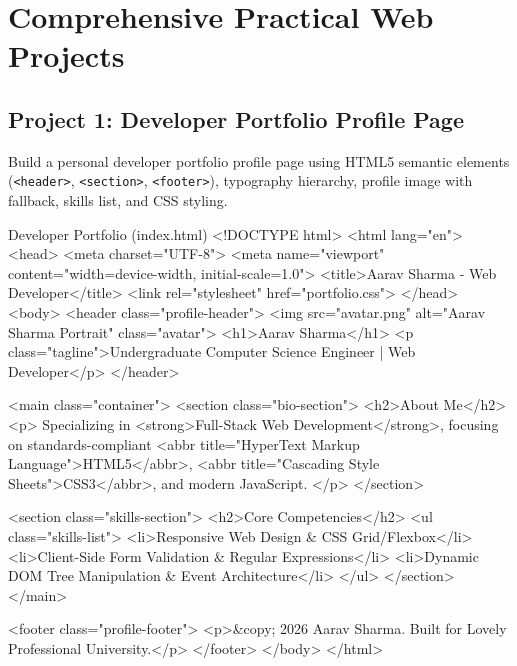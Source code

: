 \chapter{Comprehensive Practical Web Projects}
\label{chap:practical-web-projects}

\section{Project 1: Developer Portfolio Profile Page}

\begin{practiceset}
Build a personal developer portfolio profile page using HTML5 semantic elements (\texttt{<header>}, \texttt{<section>}, \texttt{<footer>}), typography hierarchy, profile image with fallback, skills list, and CSS styling.
\end{practiceset}

\begin{htmlcode}{Developer Portfolio (index.html)}
<!DOCTYPE html>
<html lang="en">
<head>
    <meta charset="UTF-8">
    <meta name="viewport" content="width=device-width, initial-scale=1.0">
    <title>Aarav Sharma - Web Developer</title>
    <link rel="stylesheet" href="portfolio.css">
</head>
<body>
    <header class="profile-header">
        <img src="avatar.png" alt="Aarav Sharma Portrait" class="avatar">
        <h1>Aarav Sharma</h1>
        <p class="tagline">Undergraduate Computer Science Engineer | Web Developer</p>
    </header>

    <main class="container">
        <section class="bio-section">
            <h2>About Me</h2>
            <p>
                Specializing in <strong>Full-Stack Web Development</strong>, focusing on 
                standards-compliant <abbr title="HyperText Markup Language">HTML5</abbr>, 
                <abbr title="Cascading Style Sheets">CSS3</abbr>, and modern JavaScript.
            </p>
        </section>

        <section class="skills-section">
            <h2>Core Competencies</h2>
            <ul class="skills-list">
                <li>Responsive Web Design & CSS Grid/Flexbox</li>
                <li>Client-Side Form Validation & Regular Expressions</li>
                <li>Dynamic DOM Tree Manipulation & Event Architecture</li>
            </ul>
        </section>
    </main>

    <footer class="profile-footer">
        <p>&copy; 2026 Aarav Sharma. Built for Lovely Professional University.</p>
    </footer>
</body>
</html>
\end{htmlcode}

